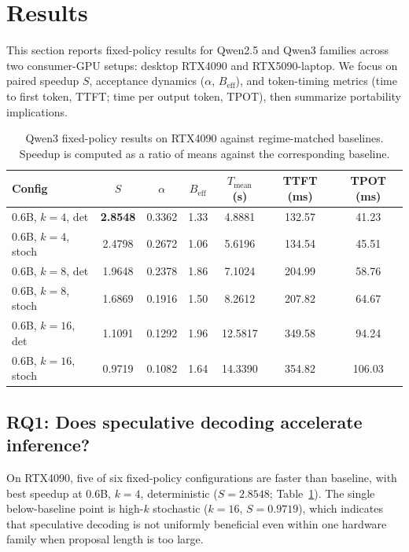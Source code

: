 \section{Results}
\label{sec:results}

This section reports fixed-policy results for Qwen2.5 and Qwen3 families
across two consumer-GPU setups: desktop RTX4090 and RTX5090-laptop.
We focus on paired speedup $S$, acceptance dynamics ($\alpha$, $B_{\text{eff}}$),
and token-timing metrics (time to first token, TTFT; time per output token,
TPOT), then summarize portability implications.

\begin{table}[t]
\centering
\caption{Qwen3 fixed-policy results on RTX4090 against regime-matched baselines.
Speedup is computed as a ratio of means against the corresponding baseline.}
\label{tab:headline-4090}
\small
\begin{tabular}{l c c c c c c}
\hline
\textbf{Config} & $S$ & $\alpha$ & $B_{\text{eff}}$ & $T_{\text{mean}}$ (s) & TTFT (ms) & TPOT (ms) \\
\hline
0.6B, $k{=}4$, det   & \textbf{2.8548} & 0.3362 & 1.33 & 4.8881 & 132.57 & 41.23 \\
0.6B, $k{=}4$, stoch & 2.4798 & 0.2672 & 1.06 & 5.6196 & 134.54 & 45.51 \\
0.6B, $k{=}8$, det   & 1.9648 & 0.2378 & 1.86 & 7.1024 & 204.99 & 58.76 \\
0.6B, $k{=}8$, stoch & 1.6869 & 0.1916 & 1.50 & 8.2612 & 207.82 & 64.67 \\
0.6B, $k{=}16$, det  & 1.1091 & 0.1292 & 1.96 & 12.5817 & 349.58 & 94.24 \\
0.6B, $k{=}16$, stoch& 0.9719 & 0.1082 & 1.64 & 14.3390 & 354.82 & 106.03 \\
\hline
\end{tabular}
\end{table}

\subsection{RQ1: Does speculative decoding accelerate inference?}

On RTX4090, five of six fixed-policy configurations are faster than baseline,
with best speedup at 0.6B, $k{=}4$, deterministic ($S{=}2.8548$;
Table~\ref{tab:headline-4090}).
The single below-baseline point is high-$k$ stochastic ($k{=}16$, $S{=}0.9719$),
which indicates that speculative decoding is not uniformly beneficial even
within one hardware family when proposal length is too large.

